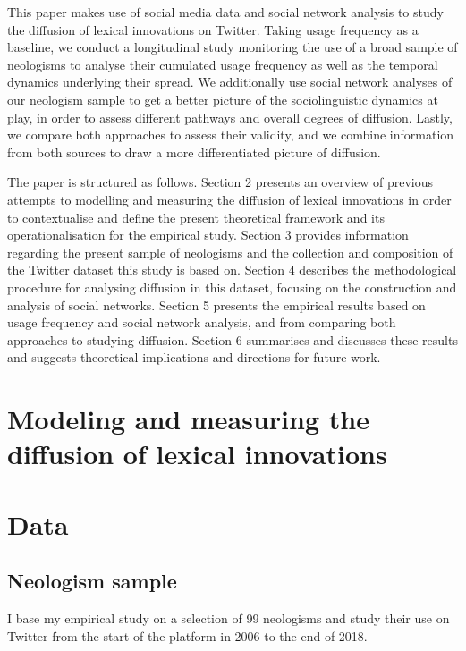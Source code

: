 \documentclass[
  a4paper,
  abstract=on,
  captions=tableabove
  ]{scrartcl}
\begin{document}
This paper makes use of social media data and social network analysis to study the diffusion of lexical innovations on Twitter. Taking usage frequency as a baseline, we conduct a longitudinal study monitoring the use of a broad sample of neologisms to analyse their cumulated usage frequency as well as the temporal dynamics underlying their spread. We additionally use social network analyses of our neologism sample to get a better picture of the sociolinguistic dynamics at play, in order to assess different pathways and overall degrees of diffusion. Lastly, we compare both approaches to assess their validity, and we combine information from both sources to draw a more differentiated picture of diffusion.

The paper is structured as follows. Section 2 presents an overview of previous attempts to modelling and measuring the diffusion of lexical innovations in order to contextualise and define the present theoretical framework and its operationalisation for the empirical study. Section 3 provides information regarding the present sample of neologisms and the collection and composition of the Twitter dataset this study is based on. Section 4 describes the methodological procedure for analysing diffusion in this dataset, focusing on the construction and analysis of social networks. Section 5 presents the empirical results based on usage frequency and social network analysis, and from comparing both approaches to studying diffusion. Section 6 summarises and discusses these results and suggests theoretical implications and directions for future work.

\section{Modeling and measuring the diffusion of lexical innovations}

\section{Data}
  \label{sec:data}
  \subsection{Neologism sample}
    \label{subsec:neo-sample}

  I base my empirical study on a selection of 99 neologisms and study their use on Twitter from the start of the platform in 2006 to the end of 2018.
\end{document}
